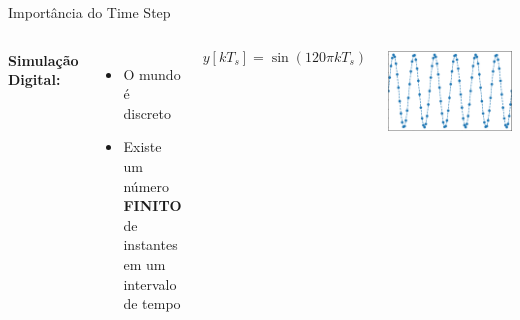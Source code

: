 \begin{frame}{\color{blue} Importância do {Time Step}}
\centering
\color{blue}

\begin{columns}


\centering
\textbf{Simulação Digital:}

\begin{itemize}
\vspace{0.5cm}
\item O mundo é discreto
\vspace*{1cm}
\item Existe um número \textbf{FINITO} de instantes em um intervalo de tempo  
\end{itemize}

\centering


\begin{equation*}
y[k T_s] = \sin(120\pi k T_s)
\end{equation*}
%


\includegraphics[width=0.95\linewidth]{./figuras/Primeiros-Passos/Sin_discreto1}


\end{columns}



\end{frame}








